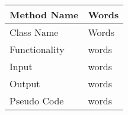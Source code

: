 \documentclass{article}
\begin{document}


\begin{center}
\begin{tabular}{|p{2.5cm}||p{10cm}|}
\hline
Method Name & Words \\
\hline
Class Name & Words \\
\hline
Functionality & words\\
\hline

Input & words\\
\hline
Output & words\\
\hline

Pseudo Code & words\\
\hline
\end{tabular}
\end{center}

\end{document}
